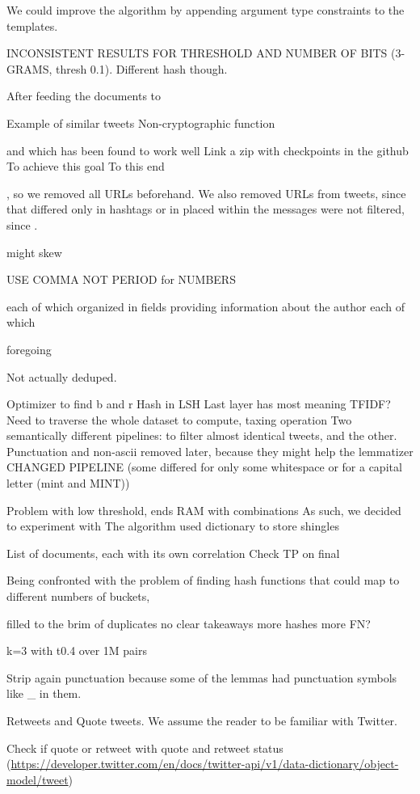 \documentclass[runningheads]{llncs}
\begin{document}
We could improve the algorithm by appending argument type constraints to the templates.

INCONSISTENT RESULTS FOR THRESHOLD AND NUMBER OF BITS (3-GRAMS, thresh 0.1). Different hash though.


After feeding the documents to 

Example of similar tweets
Non-cryptographic function

and which has been found to work well  
Link a zip with checkpoints in the github
To achieve this goal
To this end

, so we removed all URLs 
beforehand. 
We also removed URLs from tweets, since that differed only in hashtags or in  placed within the messages were not filtered, since . 

might skew

USE COMMA NOT PERIOD for NUMBERS

each of which organized in fields providing information about the author
each of which  

foregoing

Not actually deduped.

Optimizer to find b and r
Hash in LSH
Last layer has most meaning
TFIDF? Need to traverse the whole dataset to compute, taxing operation
Two semantically different pipelines: to filter almost identical tweets, and the other.
Punctuation and non-ascii removed later, because they might help the lemmatizer
CHANGED PIPELINE (some differed for only some whitespace or for a capital letter (mint and MINT))

Problem with low threshold, ends RAM with combinations
As such, we decided to experiment with   
The algorithm 
used dictionary to store shingles 

List of documents, each with its own correlation
Check TP on final


Being confronted with the problem of finding hash functions that could map to different numbers of buckets,

filled to the brim of duplicates
no clear takeaways
more hashes more FN?

k=3 with t0.4 over 1M pairs

Strip again punctuation because some of the lemmas had punctuation symbols like \_ in them.

Retweets and Quote tweets. We assume the reader to be familiar with Twitter.

Check if quote or retweet with quote and retweet status (\url{https://developer.twitter.com/en/docs/twitter-api/v1/data-dictionary/object-model/tweet})
\end{document}
